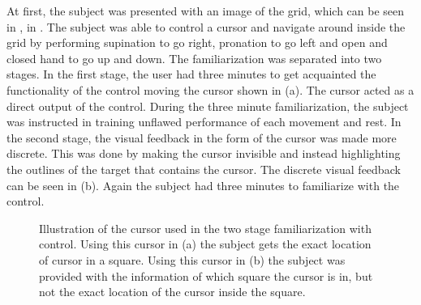 At first, the subject was presented with an image of the grid, which can be seen in , in . The subject was able to control a cursor and navigate around inside the grid by performing supination to go right, pronation to go left and open and closed hand to go up and down. The familiarization was separated into two stages. In the first stage, the user had three minutes to get acquainted the functionality of the control moving the cursor shown in  (a). The cursor acted as a direct output of the control. During the three minute familiarization, the subject was instructed in training unflawed performance of each movement and rest. In the second stage, the visual feedback in the form of the cursor was made more discrete. This was done by making the cursor invisible and instead highlighting the outlines of the target that contains the cursor. The discrete visual feedback can be seen in  (b). Again the subject had three minutes to familiarize with the control. 

\begin{figure}[H]
	\hspace{0.9cm}
	\caption{Illustration of the cursor used in the two stage familiarization with control.  Using this cursor in (a) the subject gets the exact location of cursor in a square. Using this cursor in (b) the subject was provided with the information of which square the cursor is in, but not the exact location of the cursor inside the square. }
	\label{fig:C1}
\end{figure}

